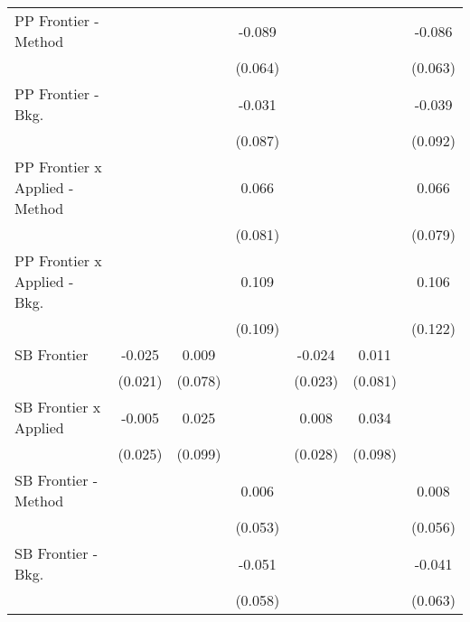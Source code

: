 \begin{tabular}{lcccccc}
   PP Frontier - Method           &               &               & -0.089      &               &               & -0.086\\   
                                  &               &               & (0.064)     &               &               & (0.063)\\   
   PP Frontier - Bkg.             &               &               & -0.031      &               &               & -0.039\\   
                                  &               &               & (0.087)     &               &               & (0.092)\\   
   PP Frontier x Applied - Method &               &               & 0.066       &               &               & 0.066\\   
                                  &               &               & (0.081)     &               &               & (0.079)\\   
   PP Frontier x Applied - Bkg.   &               &               & 0.109       &               &               & 0.106\\   
                                  &               &               & (0.109)     &               &               & (0.122)\\   
   SB Frontier                    & -0.025        & 0.009         &             & -0.024        & 0.011         &   \\   
                                  & (0.021)       & (0.078)       &             & (0.023)       & (0.081)       &   \\   
   SB Frontier x Applied          & -0.005        & 0.025         &             & 0.008         & 0.034         &   \\   
                                  & (0.025)       & (0.099)       &             & (0.028)       & (0.098)       &   \\   
   SB Frontier - Method           &               &               & 0.006       &               &               & 0.008\\   
                                  &               &               & (0.053)     &               &               & (0.056)\\   
   SB Frontier - Bkg.             &               &               & -0.051      &               &               & -0.041\\   
                                  &               &               & (0.058)     &               &               & (0.063)\\   

\end{tabular}

